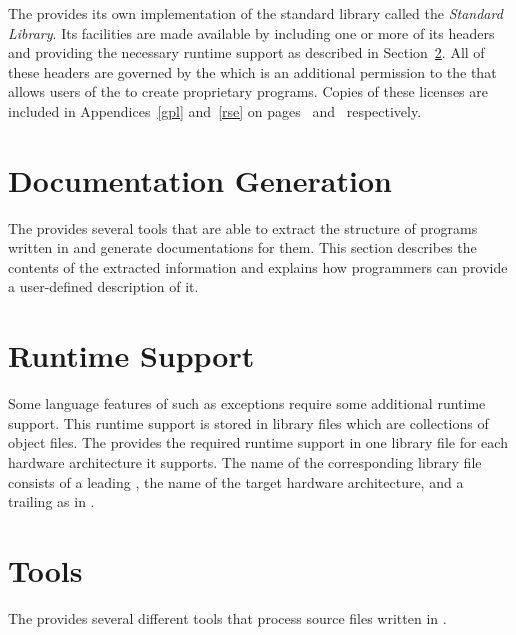 The \ecs{} provides its own implementation of the \cpp{} standard library called the \emph{Standard \cpp{} Library}.
Its facilities are made available by including one or more of its headers and providing the necessary runtime support as described in Section~\ref{sec:cppruntimesupport}.
All of these headers are governed by the \rse{} which is an additional permission to the \gpl{} that allows users of the \ecs{} to create proprietary programs.
\ifbook Copies of these licenses are included in Appendices~\ref{gpl} and~\ref{rse} on pages~\pageref{gpl} and~\pageref{rse} respectively. \fi



\section{Documentation Generation}

The \ecs{} provides several tools that are able to extract the structure of programs written in \cpp{} and generate documentations for them.
This section describes the contents of the extracted information and explains how programmers can provide a user-defined description of it.

\ifbook\else\markuptable\fi

\section{Runtime Support}\label{sec:cppruntimesupport}

Some language features of \cpp{} such as exceptions require some additional runtime support.
This runtime support is stored in library files which are collections of object files. \seeobject
The \ecs{} provides the required runtime support in one library file for each hardware architecture it supports.
The name of the corresponding library file consists of a leading , the name of the target hardware architecture, and a trailing  as in .

\section{\cpp{} Tools}

The \ecs{} provides several different tools that process source files written in \cpp{}.
\interface

